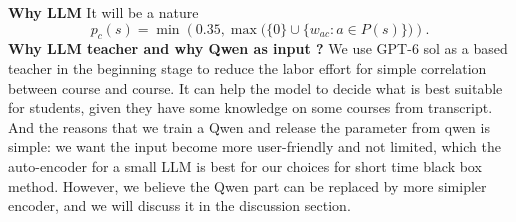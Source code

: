\documentclass{article}
\begin{document}
\textbf{Why LLM} It will be a nature
\begin{equation}
p_c(s)=\min\!\left(0.35,\max\bigl(\{0\}\cup\{w_{ac}:a\in P(s)\}\bigr)\right).
\end{equation}
\textbf{Why LLM teacher and why Qwen as input ?} We use GPT-6 sol as a based teacher in the beginning stage to reduce the labor effort for simple correlation between course and course. It can help the model to decide what is best suitable for students, given they have some knowledge on some courses from transcript.\\
And the reasons that we train a Qwen and release the parameter from qwen is simple: we want the input become more user-friendly and not limited, which the auto-encoder for a small LLM is best for our choices for short time black box method. However, we believe the Qwen part can be replaced by more simipler encoder, and we will discuss it in the discussion section.

\newpage
\end{document}
